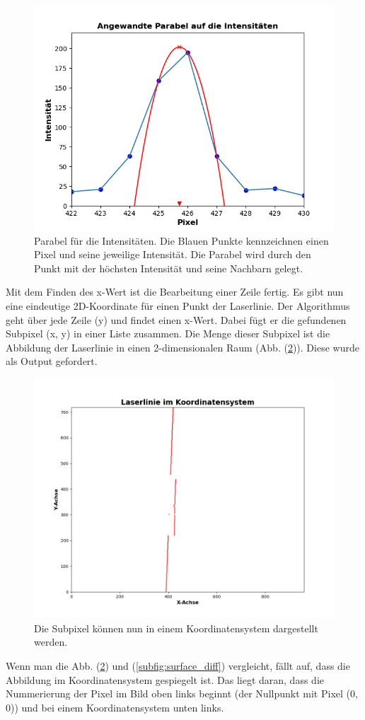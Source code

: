 	\begin{figure}[h]
		\centering
		\includegraphics[width=0.7\linewidth]{img/hauptteil/bildverarbeitung/parable_intensities.png}
		\caption[Parabel für die Intensitäten]{Parabel für die Intensitäten. Die Blauen Punkte kennzeichnen einen Pixel und seine jeweilige Intensität. Die Parabel wird durch den Punkt mit der höchsten Intensität und seine Nachbarn gelegt.}
		\label{fig:parable}
	\end{figure} 
	
	Mit dem Finden des x-Wert ist die Bearbeitung einer Zeile fertig. Es gibt nun eine eindeutige 2D-Koordinate für einen Punkt der Laserlinie. Der Algorithmus geht über jede Zeile (y) und findet einen x-Wert. Dabei fügt er die gefundenen Subpixel (x, y) in einer Liste zusammen. Die Menge dieser Subpixel ist die Abbildung der Laserlinie in einen 2-dimensionalen Raum (Abb. (\ref{fig:pix_koord})). Diese wurde als Output gefordert.
	
	\begin{figure}[h]
		\centering
		\includegraphics[width=0.8\linewidth]{img/hauptteil/bildverarbeitung/pixel_koord.png}
		\caption[Subpixel im Koordinatensystem]{Die Subpixel können nun in einem Koordinatensystem dargestellt werden.}
		\label{fig:pix_koord}
	\end{figure} 

	Wenn man die Abb. (\ref{fig:pix_koord}) und (\ref{subfig:surface_diff}) vergleicht, fällt auf, dass die Abbildung im Koordinatensystem gespiegelt ist. Das liegt daran, dass die Nummerierung der Pixel im Bild oben links beginnt (der Nullpunkt mit Pixel (0, 0)) und bei einem Koordinatensystem unten links. 

	\label{chap:erkennen_der_laserlinie}
